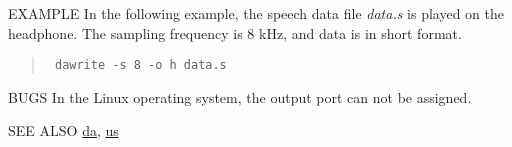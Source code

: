\begin{qsection}{EXAMPLE}
In the following example, the speech data file {\em data.s}
is played on the headphone.
The sampling frequency is 8 kHz, and data is in short format.
\begin{quote}
\verb! dawrite -s 8 -o h data.s!
\end{quote}
\end{qsection}

\begin{qsection}{BUGS}
In the Linux operating system, the output port can not be assigned.
\end{qsection}

\begin{qsection}{SEE ALSO}
\hyperlink{da}{da},
\hyperlink{us}{us}
\end{qsection}
